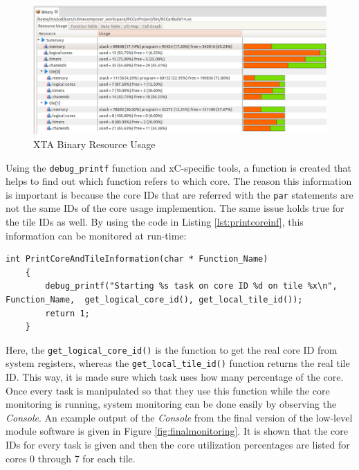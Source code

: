 \begin{figure}[!ht]
	\centering
	\captionsetup{justification=centering}
	\includegraphics[width=\textwidth]{content/images/binaryresourceusage.png}
	\caption{XTA Binary Resource Usage}
	\label{fig:binaryresourceusage}
\end{figure}

Using the \texttt{debug\texttt{\_}printf} function and xC-specific tools, a function is created that helps to find out which function refers to which core. The reason this information is important is because the core IDs that are referred with the \texttt{par} statements are not the same IDs of the core usage implemention. The same issue holds true for the tile IDs as well. By using the code in Listing \ref{lst:printcoreinf}, this information can be monitored at run-time:

\begin{lstlisting}[caption={Printing core and tile information},label={lst:printcoreinf},style=xc]
	int PrintCoreAndTileInformation(char * Function_Name)
	{
		debug_printf("Starting %s task on core ID %d on tile %x\n", Function_Name, 	get_logical_core_id(), get_local_tile_id());
		return 1;
	}
\end{lstlisting}

Here, the \texttt{get\texttt{\_}logical\texttt{\_}core\texttt{\_}id()} is the function to get the real core ID from system registers, whereas the \texttt{get\texttt{\_}local\texttt{\_}tile\texttt{\_}id()} function returns the real tile ID. This way, it is made sure which task uses how many percentage of the core. Once every task is manipulated so that they use this function while the core monitoring is running, system monitoring can be done easily by observing the \textit{Console}. An example output of the \textit{Console} from the final version of the low-level module software is given in Figure \ref{fig:finalmonitoring}. It is shown that the core IDs for every task is given and then the core utilization percentages are listed for cores 0 through 7 for each tile.

